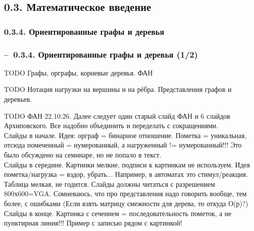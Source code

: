 \documentclass[mathserif,12pt,aspectratio=169]{beamer}
\def\TODO#1{{\color{gray} TODO {#1}}}
\def\Er{{\color{red}\textbf{--}\ }}
\begin{document}
\subsection{0.3. Математическое введение}\label{0.3}

\subsubsection{0.3.4. Ориентированные графы и деревья}\label{0.3.4}
\begin{frame}
\frametitle{\Er 0.3.4. Ориентированные графы и деревья (1/2)}
\TODO{Графы, орграфы, корневые деревья. ФАН}

\medskip
\TODO{Нотация нагрузки на вершины и на рёбра. Представления графов и деревьев. }

\medskip
\TODO{ФАН 22.10.26. Далее следует один старый слайд ФАН и 6 слайдов Архиповского.
Все надобно объединить и переделать с сокращениями. \\
Слайды в начале. Идея: орграф = бинарное отношение. Пометка = уникальная, отсюда помеченный = нумерованный, а нагруженный != нумерованный!!! Это было обсуждено на семинаре, но не попало в текст.\\
Слайды в середине. Картинки мелкие, подписи к картинкам не используем. Идея пометка/нагрузка = вздор, убрать... Например, в автоматах это стимул/реакция.     
Таблица мелкая, не годится. Слайды должны читаться с разрешением 800х600=VGA. Сомневаюсь, что про представления надо говорить вообще, тем более, с ошибками (Если взять матрицу смежности для дерева, то откуда О(р)?) \\
Слайды в конце. Картинка с сечением = последовательность пометок, а не пунктирная линия!!!
Пример с записью рядом с картинкой!}

\end{frame}
\end{document}
